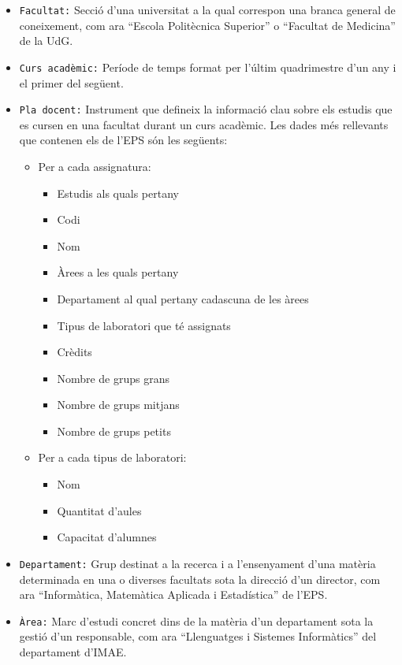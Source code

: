 \documentclass[a4paper,12pt]{ThesisStyle}
\begin{document}
\begin{itemize}
  \item \texttt{Facultat:} Secció d'una universitat a la qual correspon una branca general de coneixement, com ara ``Escola Politècnica Superior'' o ``Facultat de Medicina'' de la UdG.
  \item \texttt{Curs acadèmic:} Període de temps format per l'últim quadrimestre d'un any i el primer del següent.
  \item \texttt{Pla docent:} Instrument que defineix la informació clau sobre els estudis que es cursen en una facultat durant un curs acadèmic. Les dades més rellevants que contenen els de l'EPS són les següents:
  \begin{itemize}
    \item Per a cada assignatura:
    \begin{itemize}
      \item Estudis als quals pertany
      \item Codi
      \item Nom
      \item Àrees a les quals pertany
      \item Departament al qual pertany cadascuna de les àrees
      \item Tipus de laboratori que té assignats
      \item Crèdits
      \item Nombre de grups grans
      \item Nombre de grups mitjans
      \item Nombre de grups petits
    \end{itemize}
    \item Per a cada tipus de laboratori:
    \begin{itemize}
      \item Nom
      \item Quantitat d'aules
      \item Capacitat d'alumnes
    \end{itemize}
  \end{itemize}
  \item \texttt{Departament:} Grup destinat a la recerca i a l'ensenyament d'una matèria determinada en una o diverses facultats sota la direcció d'un director, com ara ``Informàtica, Matemàtica Aplicada i Estadística'' de l'EPS.
  \item \texttt{Àrea:} Marc d'estudi concret dins de la matèria d'un departament sota la gestió d'un responsable, com ara ``Llenguatges i Sistemes Informàtics'' del departament d'IMAE.

\end{itemize}
\end{document}
